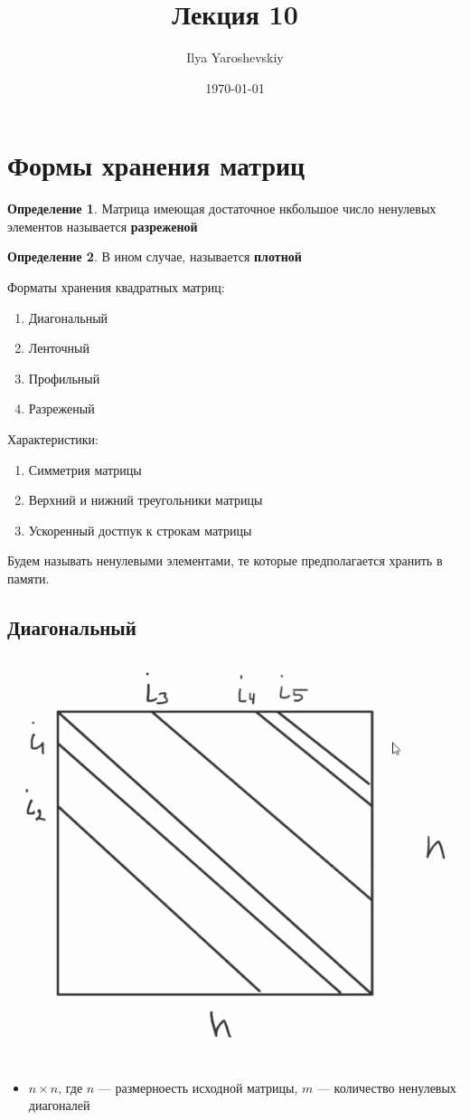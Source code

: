 \documentclass[english]{article}
\author{Ilya Yaroshevskiy}
\date{\today}
\title{Лекция 10}
\theoremstyle{plain}
\theoremstyle{remark}
\theoremstyle{definition}
\newtheorem*{definition}{Определение}
\begin{document}
\maketitle
\tableofcontents


\section{Формы хранения матриц}
\label{sec:orgb7858d8}
\begin{definition}
Матрица имеющая достаточное нкбольшое число ненулевых элементов называется \textbf{разреженой}
\end{definition}
\begin{definition}
В ином случае, называется \textbf{плотной}
\end{definition}
Форматы хранения квадратных матриц:
\begin{enumerate}
\item Диагональный
\item Ленточный
\item Профильный
\item Разреженый
\end{enumerate}
Характеристики:
\begin{enumerate}
\item Симметрия матрицы
\item Верхний и нижний треугольники матрицы
\item Ускоренный достпук к строкам матрицы
\end{enumerate}
Будем называть ненулевыми элементами, те которые предполагается хранить в памяти.
\subsection{Диагональный}
\label{sec:org9b928e0}
\begin{center}
\includegraphics[scale=0.3]{10_1.png}
\end{center}
\begin{itemize}
\item \(n \times n\), где \(n\) --- размерноесть исходной матрицы, \(m\) --- количество ненулевых диагоналей
\end{itemize}
\end{document}
